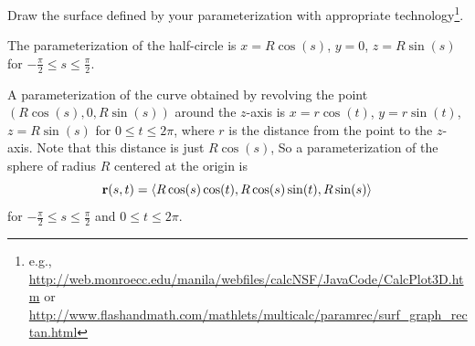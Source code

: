 \begin{activity}
  \item Draw the surface defined by your parameterization with
    appropriate technology\footnote{e.g.,
    \url{http://web.monroecc.edu/manila/webfiles/calcNSF/JavaCode/CalcPlot3D.htm}
    or
    \url{http://www.flashandmath.com/mathlets/multicalc/paramrec/surf_graph_rectan.html}}.

    \ea



\end{activity}
\begin{smallhint}

\end{smallhint}
\begin{bighint}

\end{bighint}
\begin{activitySolution}
\ba
\item The parameterization of the half-circle is $x = R\cos(s)$, $y = 0$, $z=R\sin(s)$ for $-\frac{\pi}{2} \leq s \leq \frac{\pi}{2}$. 
\item A parameterization of the curve obtained by revolving the point $(R\cos(s), 0, R\sin(s))$ around the $z$-axis is $x=r\cos(t)$, $y=r\sin(t)$, $z=R\sin(s)$ for $0 \leq t \leq 2\pi$, where $r$ is the distance from the point to the $z$-axis. Note that this distance is just $R\cos(s)$, So a parameterization of the sphere of radius $R$ centered at the origin is 
\[\mathbf{r}(s,t) = \langle R\cos(s)\cos(t), R\cos(s)\sin(t), R\sin(s) \rangle\]
for  $-\frac{\pi}{2} \leq s \leq \frac{\pi}{2}$ and $0 \leq t \leq 2\pi$. 
\ea

\end{activitySolution}
\aftera
